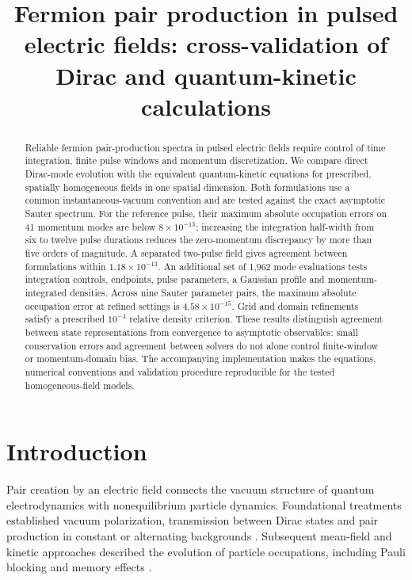 \documentclass[anonymous]{iopjournal}
\renewcommand{\articletype}[1]{\vspace*{-8mm}\noindent{\Large\sf Physica Scripta}\par\vspace*{8mm}\noindent{\scriptsize\sf\bfseries\MakeUppercase{#1}}\par}
\begin{document}
\articletype{Paper}

\title{Fermion pair production in pulsed electric fields: cross-validation of Dirac and quantum-kinetic calculations}

\author{}



\begin{abstract}
Reliable fermion pair-production spectra in pulsed electric fields require control of time integration, finite pulse windows and momentum discretization. We compare direct Dirac-mode evolution with the equivalent quantum-kinetic equations for prescribed, spatially homogeneous fields in one spatial dimension. Both formulations use a common instantaneous-vacuum convention and are tested against the exact asymptotic Sauter spectrum. For the reference pulse, their maximum absolute occupation errors on 41 momentum modes are below $8\times10^{-13}$; increasing the integration half-width from six to twelve pulse durations reduces the zero-momentum discrepancy by more than five orders of magnitude. A separated two-pulse field gives agreement between formulations within $1.18\times10^{-13}$. An additional set of 1,962 mode evaluations tests integration controls, endpoints, pulse parameters, a Gaussian profile and momentum-integrated densities. Across nine Sauter parameter pairs, the maximum absolute occupation error at refined settings is $4.58\times10^{-15}$. Grid and domain refinements satisfy a prescribed $10^{-4}$ relative density criterion. These results distinguish agreement between state representations from convergence to asymptotic observables: small conservation errors and agreement between solvers do not alone control finite-window or momentum-domain bias. The accompanying implementation makes the equations, numerical conventions and validation procedure reproducible for the tested homogeneous-field models.
\end{abstract}

\section{Introduction}

Pair creation by an electric field connects the vacuum structure of quantum electrodynamics with nonequilibrium particle dynamics. Foundational treatments established vacuum polarization, transmission between Dirac states and pair production in constant or alternating backgrounds \cite{EulerHeisenberg1936,Sauter1931,Schwinger1951,BrezinItzykson1970}. Subsequent mean-field and kinetic approaches described the evolution of particle occupations, including Pauli blocking and memory effects \cite{Kluger1991,Kluger1992,Kluger1998,Schmidt1998,Schmidt1999}.
\end{document}
